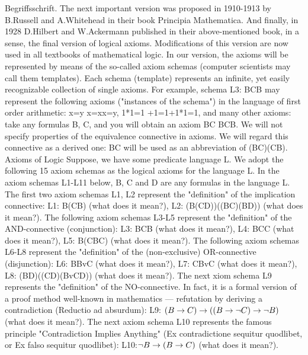 Begriffsschrift. The next important version was proposed in 1910-1913 by B.Russell and A.Whitehead in
their book Principia Mathematica. And finally, in 1928 D.Hilbert and W.Ackermann published in their
above-mentioned book, in a sense, the final version of logical axioms. Modifications of this version are
now used in all textbooks of mathematical logic.
In our version, the axioms will be represented by means of the so-called axiom schemas (computer
scientists may call them templates). Each schema (template) represents an infinite, yet easily recognizable
collection of single axioms. For example, schema L3: B\AND C\IMPLIES B may represent the following axioms
("instances of the schema") in the language of first order arithmetic:
x=y \AND  x=x\IMPLIES x=y,
1*1=1 +1=1+1*1=1,
and many other axioms: take any formulas B, C, and you will obtain an axiom B\AND C B\AND C\IMPLIES B.
We will not specify properties of the equivalence connective in axioms. We will regard this connective as
a derived one: B\IFF C will be used as an abbreviation of (B\IMPLIES C)\AND (C\IMPLIES B).
Axioms of Logic
Suppose, we have some predicate language L. We adopt the following 15 axiom schemas as the logical
axioms for the language L.
In the axiom schemas L1-L11 below, B, C and D are any formulas in the language L.
The first two axiom schemas L1, L2 represent the "definition" of the implication connective:
L1: B\IMPLIES (C\IMPLIES B) (what does it mean?),
L2: (B\IMPLIES (C\IMPLIES D))\IMPLIES ((B\IMPLIES C)\IMPLIES (B\IMPLIES D)) (what does it mean?).
The following axiom schemas L3-L5 represent the "definition" of the AND-connective (conjunction):
L3: B\AND C\IMPLIES B (what does it mean?),
L4: B\AND C\IMPLIES C (what does it mean?),
L5: B\IMPLIES (C\IMPLIES B\AND C) (what does it mean?).
The following axiom schemas L6-L8 represent the "definition" of the (non-exclusive) OR-connective
(disjunction):
L6: B\IMPLIES BvC (what does it mean?),
L7: C\IMPLIES BvC (what does it mean?),
L8: (B\IMPLIES D)\IMPLIES ((C\IMPLIES D)\IMPLIES (BvC\IMPLIES D)) (what does it mean?).
The next xiom schema L9 represents the "definition" of the NO-connective. In fact, it is a formal version
of a proof method well-known in mathematics --- refutation by deriving a contradiction (Reductio ad
absurdum):
L9: \((B\rightarrow C)\rightarrow ((B\rightarrow \neg C)\rightarrow \neg B)\) (what does it mean?).
The next axiom schema L10 represents the famous principle "Contradiction Implies Anything" (Ex
contradictione sequitur quodlibet, or Ex falso sequitur quodlibet):
L10:\( \neg B\rightarrow (B\rightarrow C)\) (what does it mean?).
